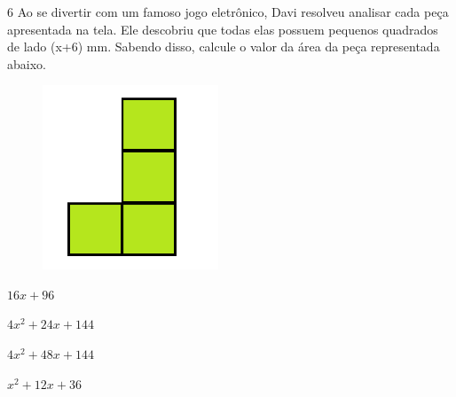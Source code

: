 

\num{6} Ao se divertir com um famoso jogo eletrônico, Davi resolveu analisar
cada peça apresentada na tela. Ele descobriu que todas elas possuem
pequenos quadrados de lado (x+6) mm. Sabendo disso, calcule o valor da
área da peça representada abaixo.

\begin{figure}[H]
\centering\includegraphics[width=2.05833in,height=2.16573in]{./imgSAEB_8_MAT/media/image57.png}
\end{figure}

\begin{escolha}
\item $16x + 96$
\item $4x^2 + 24x+ 144$
\item $4x^2 + 48x+144$
\item $x^2 + 12x + 36$
\end{escolha}









